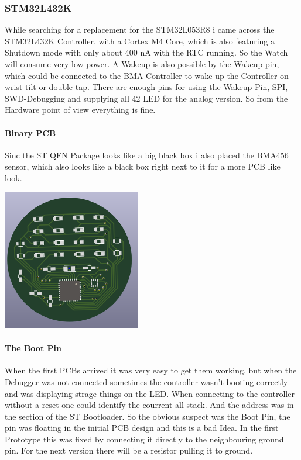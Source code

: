 \subsubsection{STM32L432K} 
While searching for a replacement for the STM32L053R8 i came across the STM32L432K Controller, with a Cortex M4 Core, which is also featuring a Shutdown mode with only about 400 nA with the RTC running. So the Watch will consume very low power. A Wakeup is also possible by the Wakeup pin, which could be connected to the BMA Controller to wake up the Controller on wrist tilt or double-tap. There are enough pins for using the Wakeup Pin, SPI, SWD-Debugging and supplying all 42 LED for the analog version.
So from the Hardware point of view everything is fine.

\paragraph{Binary PCB}
Sinc the ST QFN Package looks like a big black box i also placed the BMA456 sensor, which also looks like a black box right next to it for a more PCB like look.
\begin{center}
\includegraphics[width=0.45\textwidth]{../Schematics/Schematics_STM/Watch.png}
\end{center}
\paragraph{The Boot Pin}
When the first PCBs arrived it was very easy to get them working, but when the Debugger was not connected sometimes the controller wasn't booting correctly and was displaying strage things on the LED. When connecting to the controller without a reset one could identify the courrent all stack. And the address was in the section of the ST Bootloader. So the obvious suspect was the Boot Pin, the pin was floating in the initial PCB design and this is a bad Idea. In the first Prototype this was fixed by connecting it directly to the neighbouring ground pin. For the next version there will be a resistor pulling it to ground.

